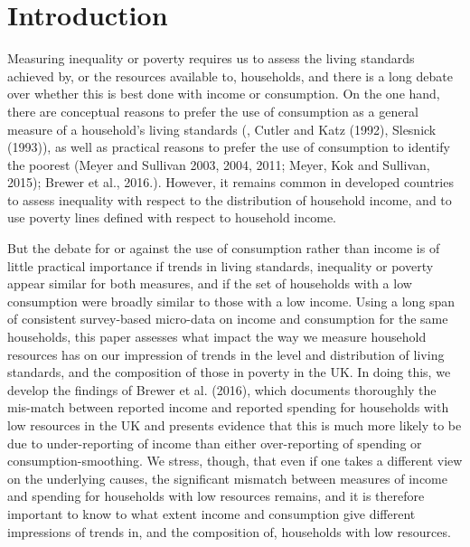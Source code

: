 
\section{Introduction} 



Measuring inequality or poverty requires us to assess the living standards achieved by, or the resources available to, households, and there is a long debate over whether this is best done with income or consumption. On the one hand, there are conceptual reasons to prefer the use of consumption as a general measure of a household's living standards (\cite{Poterba1989}, Cutler and Katz (1992), Slesnick (1993)), as well as practical reasons to prefer the use of consumption to identify the poorest (Meyer and Sullivan 2003, 2004, 2011; Meyer, Kok and Sullivan, 2015); Brewer et al., 2016.). However, it remains common in developed countries to assess inequality with respect to the distribution of household income, and to use poverty lines defined with respect to household income. 

But the debate for or against the use of consumption rather than income is of little practical importance if trends in living standards, inequality or poverty appear similar for both measures, and if the set of households with a low consumption were broadly similar to those with a low income. Using a long span of consistent survey-based micro-data on income and consumption for the same households, this paper assesses what impact the way we measure household resources has on our impression of trends in the level and distribution of living standards, and the composition of those in poverty in the UK. In doing this, we develop the findings of Brewer et al. (2016), which documents thoroughly the mis-match between reported income and reported spending for households with low resources in the UK and presents evidence that this is much more likely to be due to under-reporting of income than either over-reporting of spending or consumption-smoothing. We stress, though, that even if one takes a different view on the underlying causes, the significant mismatch between measures of income and spending for households with low resources remains, and it is therefore important to know to what extent income and consumption give different impressions of trends in, and the composition of, households with low resources. 

